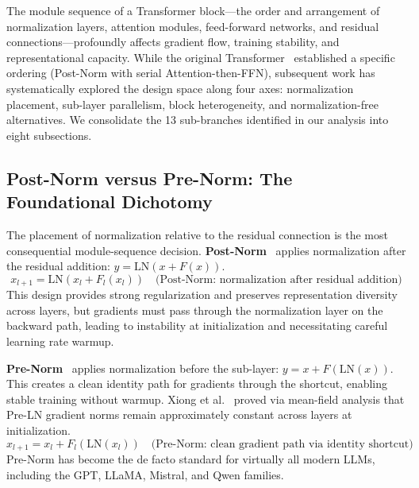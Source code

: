 \label{sec:module_sequence}

The module sequence of a Transformer block---the order and arrangement of normalization layers, attention modules, feed-forward networks, and residual connections---profoundly affects gradient flow, training stability, and representational capacity. While the original Transformer~\cite{vaswani2017attention} established a specific ordering (Post-Norm with serial Attention-then-FFN), subsequent work has systematically explored the design space along four axes: normalization placement, sub-layer parallelism, block heterogeneity, and normalization-free alternatives. We consolidate the 13 sub-branches identified in our analysis into eight subsections.

\subsection{Post-Norm versus Pre-Norm: The Foundational Dichotomy}
\label{subsec:pre_post_norm}

The placement of normalization relative to the residual connection is the most consequential module-sequence decision. \textbf{Post-Norm}~\cite{vaswani2017attention} applies normalization after the residual addition: $y = \mathrm{LN}(x + F(x))$.
\begin{equation}
x_{l+1} = \mathrm{LN}\!\left(x_l + F_l(x_l)\right) \quad \text{(Post-Norm: normalization after residual addition)}
\label{eq:postnorm}
\end{equation}
This design provides strong regularization and preserves representation diversity across layers, but gradients must pass through the normalization layer on the backward path, leading to instability at initialization and necessitating careful learning rate warmup.

\textbf{Pre-Norm}~\cite{xiong2020layer} applies normalization before the sub-layer: $y = x + F(\mathrm{LN}(x))$. This creates a clean identity path for gradients through the shortcut, enabling stable training without warmup. Xiong et al.~\cite{xiong2020layer} proved via mean-field analysis that Pre-LN gradient norms remain approximately constant across layers at initialization.
\begin{equation}
x_{l+1} = x_l + F_l\!\left(\mathrm{LN}(x_l)\right) \quad \text{(Pre-Norm: clean gradient path via identity shortcut)}
\label{eq:prenorm}
\end{equation}
Pre-Norm has become the de facto standard for virtually all modern LLMs, including the GPT, LLaMA, Mistral, and Qwen families.

